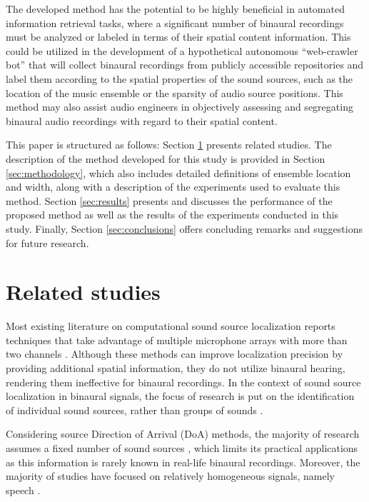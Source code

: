 \documentclass[11pt]{article}
\begin{document}
The developed method has the potential to be highly beneficial in automated information retrieval tasks, where a significant number of binaural recordings must be analyzed or labeled in terms of their spatial content information. This could be utilized in the development of a hypothetical autonomous ``web-crawler bot'' that will collect binaural recordings from publicly accessible repositories and label them according to the spatial properties of the sound sources, such as the location of the music ensemble or the sparsity of audio source positions. This method may also assist audio engineers in objectively assessing and segregating binaural audio recordings with regard to their spatial content.

This paper is structured as follows: Section \ref{sec:related-studies} presents related studies. The description of the method developed for this study is provided in Section \ref{sec:methodology}, which also includes detailed definitions of ensemble location and width, along with a description of the experiments used to evaluate this method. Section \ref{sec:results} presents and discusses the performance of the proposed method as well as the results of the experiments conducted in this study. Finally, Section \ref{sec:conclusions} offers concluding remarks and suggestions for future research.

\section{Related studies}
\label{sec:related-studies}

Most existing literature on computational sound source localization reports techniques that take advantage of multiple microphone arrays with more than two channels \parencite{kaveh_statistical_1986, pavlidi_real-time_2012, pan_multi-tone_2021, hahmann_sound_2022, chung_sound_2022, liu_sound_2022}. Although these methods can improve localization precision by providing additional spatial information, they do not utilize binaural hearing, rendering them ineffective for binaural recordings. In the context of sound source localization in binaural signals, the  focus of research is put on the identification of individual sound sources, rather than groups of sounds \parencite{dietz_auditory_2011, may_probabilistic_2011, may_binaural_2012, woodruff_binaural_2012, may_robust_2015, ma16c_interspeech, ma_exploiting_2017, benaroya_binaural_2018}.

Considering source Direction of Arrival (DoA) methods, the majority of research assumes a fixed number of sound sources \parencite{pang_multitask_2019, vera-diaz_towards_2018, ma_exploiting_2017, woodruff_binaural_2012, arthi_spatiogram_2021}, which limits its practical applications as this information is rarely known in real-life binaural recordings. Moreover, the majority of studies have focused on relatively homogeneous signals, namely speech \parencite{dietz_auditory_2011, may_probabilistic_2011, may_binaural_2012, woodruff_binaural_2012, may_robust_2015, ma16c_interspeech, ma_exploiting_2017, benaroya_binaural_2018, wang_binaural_2020, liu_multiple_2018, yang_deepear_2022, ma_robust_2018}.
\end{document}
